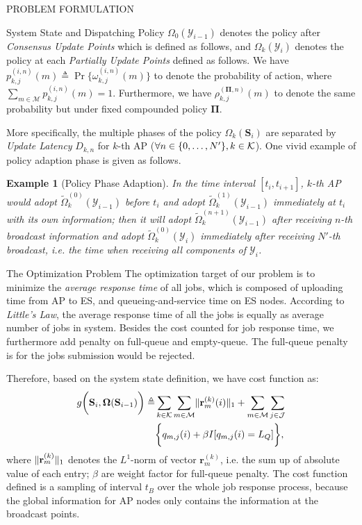 \documentclass[10pt, conference, letterpaper]{IEEEtran}
\newtheorem{example}{Example}
\newcommand{\define}{\triangleq}
\newcommand{\vecG}{\boldsymbol}
\renewcommand{\vec}{\mathbf}
\DeclarePairedDelimiter{\set}{\{}{\}}
\DeclarePairedDelimiter{\Inorm}{\|}{\|_1}
\DeclarePairedDelimiter{\Paren}{\bigg(}{\bigg)}
\DeclarePairedDelimiter{\Brace}{\bigg\{}{\bigg\}}
\newcommand{\apSet}{\mathcal{K}}
\newcommand{\esSet}{\mathcal{M}}
\newcommand{\jSpace}{\mathcal{J}}
\newcommand{\Stat}{\mathbf{S}}
\newcommand{\Obsv}{\mathcal{Y}}
\newcommand{\Policy}{\boldsymbol{\Omega}}
\begin{document}
\begin{section}{PROBLEM FORMULATION}
\begin{subsection}{System State and Dispatching Policy}
            $\Omega_{0}(\Obsv_{i-1})$ denotes the policy after \emph{Consensus Update Points} which is defined as follows, and $\Omega_{k}(\Obsv_{i})$ denotes the policy at each \emph{Partially Update Points} defined as follows.
            We have $p^{(i,n)}_{k,j}(m) \define \Pr\{\omega^{(i,n)}_{k,j}(m)\}$ to denote the probability of action, where $\sum_{m\in\esSet} p^{(i,n)}_{k,j}(m) = 1$. Furthermore, we have $\rho^{(\vecG{\Pi},n)}_{k,j}(m)$ to denote the same probability but under fixed compounded policy $\vecG{\Pi}$.

            More specifically, the multiple phases of the policy $\Omega_k(\Stat_i)$ are separated by \emph{Update Latency} $D_{k,n}$ for $k$-th AP ($\forall n\in\set{0,\dots,N'}, k\in\apSet$). One vivid example of policy adaption phase is given as follows.
            \begin{example}[Policy Phase Adaption]
                In the time interval $[t_{i}, t_{i+1}]$, $k$-th AP would adopt $\tilde{\Omega}^{(0)}_k(\Obsv_{i-1})$ before $t_i$ and adopt $\tilde{\Omega}^{(1)}_k(\Obsv_{i-1})$ immediately at $t_i$ with its own information; then it will adopt $\tilde{\Omega}^{(n+1)}_k(\Obsv_{i-1})$ after receiving $n$-th broadcast information and adopt $\tilde{\Omega}^{(0)}_k(\Obsv_{i})$ immediately after receiving $N'$-th broadcast, i.e. the time when receiving all components of $\Obsv_{i}$.
            \end{example}
        \end{subsection}

        \begin{subsection}{The Optimization Problem}
            The optimization target of our problem is to minimize the \emph{average response time} of all jobs, which is composed of uploading time from AP to ES, and queueing-and-service time on ES nodes. According to \emph{Little's Law}, the average response time of all the jobs is equally as average number of jobs in system.
            Besides the cost counted for job response time, we furthermore add penalty on full-queue and empty-queue.
            The full-queue penalty is for the jobs submission would be rejected.

            Therefore, based on the system state definition, we have cost function as:
            \begin{align}
                g\Paren{\Stat_{i}, \Policy(\Stat_{i-1})} \define& \sum_{k\in\apSet}\sum_{m\in\esSet} \Inorm{\vec{r}^{(k)}_{m}(i)} + \sum_{m\in\esSet}\sum_{j\in\jSpace}
                \nonumber\\
                &\Brace{
                    q_{m,j}(i) + \beta I[q_{m,j}(i)=L_Q]
                },
            \end{align}
            where $\Inorm{\vec{r}^{(k)}_{m}}$ denotes the $L^1$-norm of vector $\vec{r}^{(k)}_{m}$, i.e. the sum up of absolute value of each entry; $\beta$ are weight factor for full-queue penalty.
            {\color{red}The cost function defined is a sampling of interval $t_B$ over the whole job response process, because the global information for AP nodes only contains the information at the broadcast points.}


\end{subsection}
\end{section}
\end{document}
